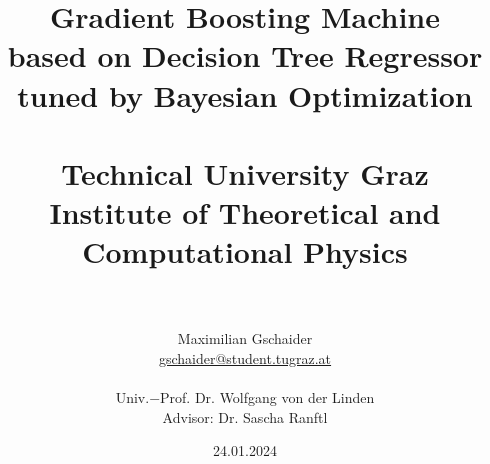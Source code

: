 \documentclass[12pt, a4paper]{article}
\begin{document}
\cfoot*{\pagemark}%

\newpage
\thispagestyle{empty}

\newpage
\clearpage

\title{
Gradient Boosting Machine \\
based on Decision Tree Regressor \\
\large tuned by Bayesian Optimization \\
\vspace{1cm}\\
\textbf{Technical University Graz}\\
Institute of Theoretical and Computational Physics}
\author{
\\\\Maximilian Gschaider\\ \href{mailto:gschaider@student.tugraz.at}{gschaider@student.tugraz.at} \\
\vspace{1cm}\\
{\small Univ.$-$Prof. Dr. Wolfgang von der Linden \\
\small Advisor: Dr. Sascha Ranftl} }
\date{24.01.2024}
\maketitle
\newpage
\end{document}
